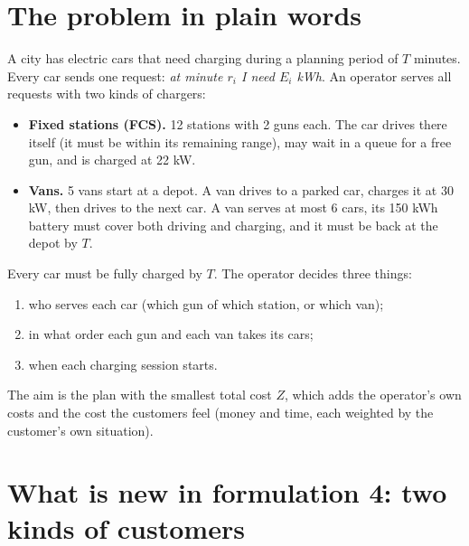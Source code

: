 \section{The problem in plain words}

A city has electric cars that need charging during a planning period of $T$ minutes. Every car sends one request: \emph{at minute $r_i$ I need $E_i$ kWh}. An operator serves all requests with two kinds of chargers:
\begin{itemize}
  \item \textbf{Fixed stations (FCS).} 12 stations with 2 guns each. The car drives there itself (it must be within its remaining range), may wait in a queue for a free gun, and is charged at 22 kW.
  \item \textbf{Vans.} 5 vans start at a depot. A van drives to a parked car, charges it at 30 kW, then drives to the next car. A van serves at most 6 cars, its 150 kWh battery must cover both driving and charging, and it must be back at the depot by $T$.
\end{itemize}
Every car must be fully charged by $T$. The operator decides three things:
\begin{enumerate}
  \item who serves each car (which gun of which station, or which van);
  \item in what order each gun and each van takes its cars;
  \item when each charging session starts.
\end{enumerate}
The aim is the plan with the smallest total cost $Z$, which adds the operator's own costs and the cost the customers feel (money and time, each weighted by the customer's own situation).


\section{What is new in formulation 4: two kinds of customers}

